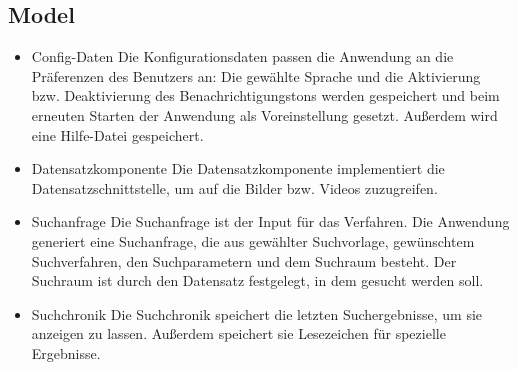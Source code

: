 \subsection{Model}
\begin{itemize}
\item Config-Daten\newline
Die Konfigurationsdaten passen die Anwendung an die Präferenzen des Benutzers an: Die gewählte Sprache und die Aktivierung bzw. Deaktivierung des Benachrichtigungstons werden gespeichert und beim erneuten Starten der Anwendung als Voreinstellung gesetzt. Außerdem wird eine Hilfe-Datei gespeichert.
\item Datensatzkomponente\newline
Die Datensatzkomponente implementiert die Datensatzschnittstelle, um auf die Bilder bzw. Videos zuzugreifen.
\item Suchanfrage\newline
Die Suchanfrage ist der Input für das Verfahren. Die Anwendung generiert eine Suchanfrage, die aus gewählter Suchvorlage, gewünschtem \gls{Suchverfahren}, den Suchparametern und dem Suchraum besteht. Der Suchraum ist durch den Datensatz festgelegt, in dem gesucht werden soll.
\item \gls{Suchchronik}\newline
Die \gls{Suchchronik} speichert die letzten Suchergebnisse, um sie anzeigen zu lassen. Außerdem speichert sie \gls{Lesezeichen} für spezielle Ergebnisse.
\end{itemize}

